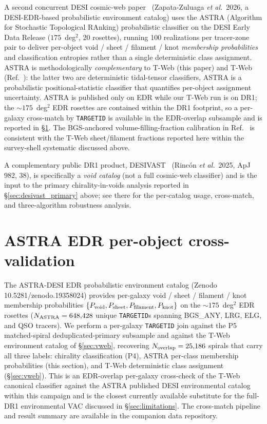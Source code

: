 \documentclass[aps,prd,twocolumn,superscriptaddress,showpacs,preprintnumbers,nofootinbib,longbibliography,floatfix]{revtex4-2}
\begin{document}
A second concurrent DESI cosmic-web paper~\cite{ASTRADESI2026} (Zapata-Zuluaga
\textit{et al.}\ 2026, a DESI-EDR-based probabilistic environment catalog) uses
the ASTRA (Algorithm for Stochastic Topological RAnking) probabilistic
classifier on the DESI Early Data Release ($175$~deg$^{2}$, 20
rosettes), running 100 realizations per tracer-zone pair to deliver
per-object void / sheet / filament / knot \emph{membership
probabilities} and classification entropies rather than a single
deterministic class assignment. ASTRA is methodologically
\emph{complementary} to T-Web (this paper) and T-Web
(Ref.~\cite{TWebDESI2026}): the latter two are deterministic
tidal-tensor classifiers, ASTRA is a probabilistic positional-statistic
classifier that quantifies per-object assignment uncertainty.
ASTRA is published only on EDR while our T-Web run is on DR1; the
$\sim\!175$~deg$^{2}$ EDR rosettes are contained within the DR1
footprint, so a per-galaxy cross-match by \texttt{TARGETID} is
available in the EDR-overlap subsample and is reported in
\S\ref{sec:astra_per_object}. The BGS-anchored volume-filling-fraction
calibration in Ref.~\cite{ASTRADESI2026} is consistent with the T-Web
sheet/filament fractions reported here within the survey-shell
systematic discussed above.

A complementary public DR1 product, DESIVAST~\cite{DESIVAST2025}
(Rinc\'on \textit{et al.}\ 2025, ApJ 982, 38), is specifically a
\emph{void catalog} (not a full cosmic-web classifier) and is the
input to the primary chirality-in-voids analysis reported in
\S\ref{sec:desivast_primary} above; see there for the per-catalog
usage, cross-match, and three-algorithm robustness analysis.

\section{ASTRA EDR per-object
cross-validation}\label{sec:astra_per_object}

The ASTRA-DESI EDR probabilistic environment catalog
\cite{ASTRADESI2026} (Zenodo 10.5281/zenodo.19358024) provides
per-galaxy void / sheet / filament / knot membership probabilities
$\{P_{\rm void}, P_{\rm sheet}, P_{\rm filament}, P_{\rm knot}\}$ on
the $\sim\!175$~deg$^{2}$ EDR rosettes ($N_{\rm ASTRA} = 648{,}428$
unique \texttt{TARGETID}s spanning BGS\_ANY, LRG, ELG, and QSO
tracers). We perform a per-galaxy \texttt{TARGETID} join against the
P5 matched-spiral deduplicated-primary subsample and against the T-Web
environment catalog of \S\ref{sec:vweb}, recovering
$N_{\rm overlap} = 25{,}186$ spirals that carry all three labels:
chirality classification (P4), ASTRA per-class membership probabilities
(this section), and T-Web deterministic class assignment
(\S\ref{sec:vweb}). This is an EDR-overlap per-galaxy cross-check of
the T-Web canonical classifier against the ASTRA published DESI
environmental catalog within this campaign and is the closest currently
available substitute for the full-DR1 environmental VAC discussed in
\S\ref{sec:limitations}. The cross-match pipeline and result summary are available in the companion data repository.
\end{document}
